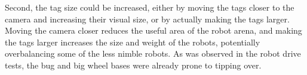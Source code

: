 Second, the tag size could be increased, either by moving the tags closer to the camera and increasing their visual size, or by actually making the tags larger. 
Moving the camera closer reduces the useful area of the robot arena, and making the tags larger increases the size and weight of the robots, potentially overbalancing some of the less nimble robots. 
As was observed in the robot drive tests, the bug and big wheel bases were already prone to tipping over. 


%
%
